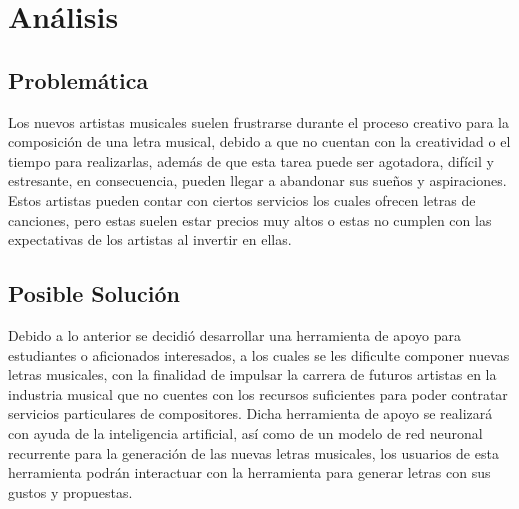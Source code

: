 \documentclass[12pt, a4paper, titlepage]{report}
\begin{document}

	\chapter{\textcolor{azulescom}{Análisis}}
	
	   \section{Problemática} %
	   Los nuevos artistas musicales suelen frustrarse durante el proceso creativo para la composición de una letra musical, debido a que no cuentan con la creatividad o el tiempo para realizarlas, además de que esta tarea puede ser agotadora, difícil y estresante, en consecuencia, pueden llegar a abandonar sus sueños y aspiraciones.
	   Estos artistas pueden contar con ciertos servicios los cuales ofrecen letras de canciones, pero estas suelen estar precios muy altos o estas no cumplen con las expectativas de los artistas al invertir en ellas.
	   \section{Posible Solución} %
	   Debido a lo anterior se decidió desarrollar una herramienta de apoyo para estudiantes o aficionados interesados, a los cuales se les dificulte componer nuevas letras musicales, con la finalidad de impulsar la carrera de futuros artistas en la industria musical que no cuentes con los recursos suficientes para poder contratar servicios particulares de compositores.
	   Dicha herramienta de apoyo se realizará con ayuda de la inteligencia artificial, así como de un modelo de red neuronal recurrente para la generación de las nuevas letras musicales, los usuarios de esta herramienta podrán interactuar con la herramienta para generar letras con sus gustos y propuestas.
	   
\end{document}
